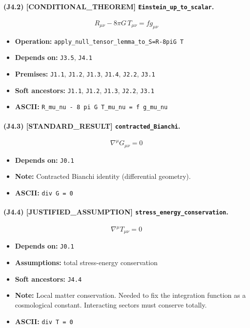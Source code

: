 \documentclass[11pt,a4paper]{article}
\theoremstyle{remark}\newtheorem*{caution}{Caution}
\newcommand{\tagbox}[1]{\textsc{[#1]}}
\begin{document}
\paragraph{(J4.2) \tagbox{CONDITIONAL\_THEOREM} \texttt{Einstein\_up\_to\_scalar}.}
\begin{equation}
R_{\mu\nu}-8\pi G\,T_{\mu\nu}=f g_{\mu\nu}
\tag{J4.2}
\end{equation}
\begin{itemize}\setlength{\itemsep}{0.12em}
\item \textbf{Operation:} \texttt{apply\_null\_tensor\_lemma\_to\_S=R-8piG T}
\item \textbf{Depends on:} \texttt{J3.5}, \texttt{J4.1}
\item \textbf{Premises:} \texttt{J1.1}, \texttt{J1.2}, \texttt{J1.3}, \texttt{J1.4}, \texttt{J2.2}, \texttt{J3.1}
\item \textbf{Soft ancestors:} \texttt{J1.1}, \texttt{J1.2}, \texttt{J1.3}, \texttt{J2.2}, \texttt{J3.1}
\item \textbf{ASCII:} \texttt{R\_mu\_nu - 8 pi G T\_mu\_nu = f g\_mu\_nu}
\end{itemize}
\paragraph{(J4.3) \tagbox{STANDARD\_RESULT} \texttt{contracted\_Bianchi}.}
\begin{equation}
\nabla^\mu G_{\mu\nu}=0
\tag{J4.3}
\end{equation}
\begin{itemize}\setlength{\itemsep}{0.12em}
\item \textbf{Depends on:} \texttt{J0.1}
\item \textbf{Note:} Contracted Bianchi identity (differential geometry).
\item \textbf{ASCII:} \texttt{div G = 0}
\end{itemize}
\paragraph{(J4.4) \tagbox{JUSTIFIED\_ASSUMPTION} \texttt{stress\_energy\_conservation}.}
\begin{equation}
\nabla^\mu T_{\mu\nu}=0
\tag{J4.4}
\end{equation}
\begin{itemize}\setlength{\itemsep}{0.12em}
\item \textbf{Depends on:} \texttt{J0.1}
\item \textbf{Assumptions:} total stress-energy conservation
\item \textbf{Soft ancestors:} \texttt{J4.4}
\item \textbf{Note:} Local matter conservation. Needed to fix the integration function as a cosmological constant. Interacting sectors must conserve totally.
\item \textbf{ASCII:} \texttt{div T = 0}
\end{itemize}
\end{document}
